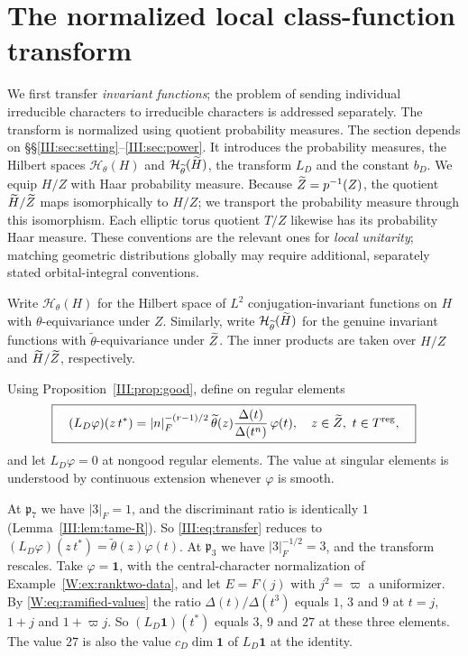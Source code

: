 \section{The normalized local class-function transform}\label{III:sec:local}
We first transfer \emph{invariant functions}; the problem of sending
individual irreducible characters to irreducible characters is
addressed separately. The transform is normalized using quotient
probability measures. The section depends on \S\S\ref{III:sec:setting}--\ref{III:sec:power}. It introduces the probability measures, the Hilbert spaces $\mathcal H_\theta(H)$ and $\mathcal H_{\widetilde\theta}(\widetilde H)$, the transform $L_D$ and the constant $b_D$.
We equip $H/Z$ with Haar probability measure. Because $\widetilde Z=p^{-1}(Z)$, the quotient $\widetilde H/\widetilde Z$ maps isomorphically to $H/Z$; we transport the probability measure through this isomorphism. Each elliptic torus quotient $T/Z$ likewise has its probability Haar measure. These conventions are the relevant ones for \emph{local unitarity}; matching geometric distributions globally may require additional, separately stated orbital-integral conventions.

Write $\mathcal H_\theta(H)$ for the Hilbert space of $L^2$ conjugation-invariant functions on $H$ with $\theta$-equivariance under $Z$. Similarly, write $\mathcal H_{\widetilde\theta}(\widetilde H)$ for the genuine invariant functions with $\widetilde\theta$-equivariance under $\widetilde Z$. The inner products are taken over $H/Z$ and $\widetilde H/\widetilde Z$, respectively.

\begin{definition}\label{III:def:L}
Using Proposition~\ref{III:prop:good}, define on regular elements
\begin{equation}\label{III:eq:transfer}
\boxed{\quad
(L_D\varphi)(z\,t^*)=
|n|_F^{-(r-1)/2}\,\widetilde\theta(z)
\frac{\Delta(t)}{\Delta(t^n)}\,\varphi(t),
\quad z\in\widetilde Z,
\ t\in T^{\mathrm{reg}},\quad}
\end{equation}
and let $L_D\varphi=0$ at nongood regular elements. The value at singular elements is understood by continuous extension whenever $\varphi$ is smooth.
\end{definition}

\begin{example}\label{III:ex:L}
At $\mathfrak p_7$ we have $|3|_F=1$, and the discriminant ratio is identically $1$ (Lemma~\ref{III:lem:tame-R}). So \eqref{III:eq:transfer} reduces to $(L_D\varphi)(z\,t^*)=\widetilde\theta(z)\varphi(t)$. At $\mathfrak p_3$ we have $|3|_F^{-1/2}=3$, and the transform rescales. Take $\varphi=\mathbf 1$, with the central-character normalization of Example~\ref{W:ex:ranktwo-data}, and let $E=F(j)$ with $j^2=\varpi$ a uniformizer. By \eqref{W:eq:ramified-values} the ratio $\Delta(t)/\Delta(t^3)$ equals $1$, $3$ and $9$ at $t=j$, $1+j$ and $1+\varpi j$. So $(L_D\mathbf 1)(t^*)$ equals $3$, $9$ and $27$ at these three elements. The value $27$ is also the value $c_D\dim\mathbf 1$ of $L_D\mathbf 1$ at the identity.
\end{example}


